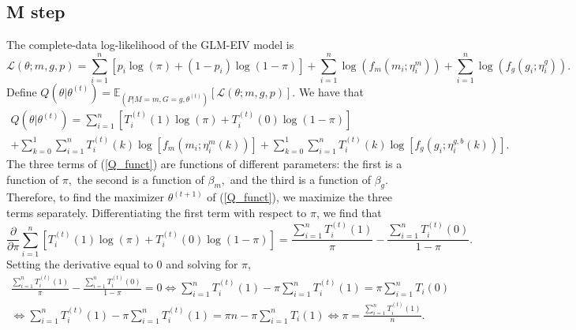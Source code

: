 \documentclass[12pt]{article}
\begin{document}
\begin{appendices}
\begin{refsection}
		\subsection*{M step}
		The complete-data log-likelihood of the GLM-EIV model  is
		\begin{equation}\label{full_log_lik}
		\mathcal{L}(\theta; m, g, p) = \sum_{i=1}^n \left[ p_i \log(\pi) + (1-p_i) \log(1-\pi) \right] + \sum_{i=1}^n \log\left( f_m(m_i; \eta^m_i)\right) + \sum_{i=1}^n \log\left( f_g(g_i; \eta_i^g) \right).
		\end{equation}
		Define $Q(\theta | \theta^{(t)}) = \mathbb{E}_{\left(P |M = m, G = g, \theta^{(t)}\right)}\left[ \mathcal{L}(\theta; m, g, p) \right].$ We have that
		\begin{multline}\label{Q_funct}
		Q(\theta |\theta^{(t)}) = \sum_{i=1}^n \left[T^{(t)}_i(1)\log(\pi) + T_i^{(t)}(0) \log(1 - \pi)\right] \\ + \sum_{k=0}^1 \sum_{i=1}^n T^{(t)}_i(k) \log \left[ f_m(m_i; \eta_i^m(k)) \right] + \sum_{k=0}^1 \sum_{i=1}^n T^{(t)}_i(k) \log \left[ f_g( g_i; \eta^{g,b}_i(k)) \right].
		\end{multline}
		The three terms of (\ref{Q_funct}) are functions of different parameters: the first is a function of $\pi,$ the second is a function of $\beta_m,$ and the third is a function of $\beta_g$. Therefore, to find the maximizer $\theta^{(t+1)}$ of (\ref{Q_funct}), we maximize the three terms separately. Differentiating the first term with respect to $\pi$, we find that
		\begin{equation*}
		\frac{ \partial }{\partial \pi } \sum_{i=1}^n \left[ T^{(t)}_i(1)\log(\pi) + T_i^{(t)}(0) \log(1 - \pi)\right]  = \frac{\sum_{i=1}^n T_i^{(t)}(1)}{\pi} - \frac{ \sum_{i=1}^n T_i^{(t)}(0) }{ 1 - \pi}.
		\end{equation*} Setting the derivative equal to $0$ and solving for $\pi$,
		\begin{multline*}
		\frac{\sum_{i=1}^n T_i^{(t)}(1)}{\pi} - \frac{ \sum_{i=1}^n T_i^{(t)}(0) }{ 1 - \pi} = 0 \iff \sum_{i=1}^n T_i^{(t)}(1) - \pi \sum_{i=1}^n T^{(t)}_i(1) = \pi \sum_{i=1}^n T_i(0) \\ \iff \sum_{i=1}^n T^{(t)}_i(1) - \pi\sum_{i=1}^n T_i^{(t)}(1) = \pi n - \pi\sum_{i=1}^n T_i(1) \iff \pi = \frac{ \sum_{i=1}^n T_i^{(t)} (1) }{n}.
	\end{multline*}


\end{refsection}
\end{appendices}
\end{document}
